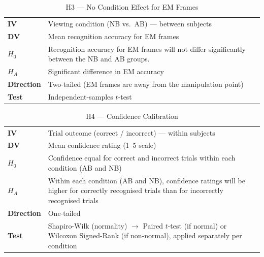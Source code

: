 \documentclass[11pt]{article}
\begin{document}
\begin{table}[H]
\centering\small
\caption*{H3 \;—\; No Condition Effect for EM Frames}
\begin{tabularx}{\textwidth}{@{} l X @{}}
\toprule
\textbf{IV}        & Viewing condition (NB vs.\ AB) --- between subjects \\
\textbf{DV}        & Mean recognition accuracy for EM frames \\
$H_0$              & Recognition accuracy for EM frames will not differ significantly between the NB and AB groups. \\
$H_A$              & Significant difference in EM accuracy \\
\textbf{Direction} & Two-tailed \;(EM frames are away from the manipulation point) \\
\textbf{Test}      & Independent-samples $t$-test \\
\bottomrule
\end{tabularx}
\end{table}

\begin{table}[H]
\centering\small
\caption*{H4 \;—\; Confidence Calibration}
\begin{tabularx}{\textwidth}{@{} l X @{}}
\toprule
\textbf{IV}        & Trial outcome (correct / incorrect) --- within subjects \\
\textbf{DV}        & Mean confidence rating (1--5 scale) \\
$H_0$              & Confidence equal for correct and incorrect trials within each condition (AB and NB) \\
$H_A$              & Within each condition (AB and NB), confidence ratings will be higher for correctly recognised trials than for incorrectly recognised trials \\
\textbf{Direction} & One-tailed \\
\textbf{Test}      & Shapiro-Wilk (normality) $\rightarrow$ Paired $t$-test (if normal) or Wilcoxon Signed-Rank (if non-normal), applied separately per condition \\
\bottomrule
\end{tabularx}
\end{table}
\end{document}
